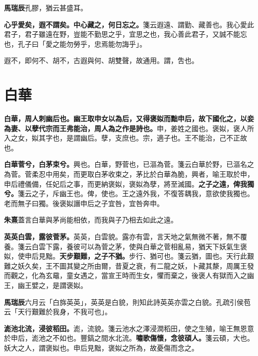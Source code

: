 \begin{quoting}\textbf{馬瑞辰}孔膠，猶云甚盛耳。\end{quoting}

\textbf{心乎愛矣，遐不謂矣。中心藏之，何日忘之。}{\footnotesize 箋云遐遠、謂勤、藏善也。我心愛此君子，君子雖遠在野，豈能不勤思之乎，宜思之也，我心善此君子，又誠不能忘也，孔子曰「愛之能勿勞乎，忠焉能勿誨乎」。}

\begin{quoting}遐不，即何不、胡不，古遐與何、胡雙聲，故通用。謂，吿也。\end{quoting}

\section{白華}


\textbf{白華，周人刺幽后也。幽王取申女以為后，又得褒姒而黜申后，故下國化之，以妾為妻、以孽代宗而王弗能治，周人為之作是詩也。}{\footnotesize 申，姜姓之國也。褒姒，褒人所入之女，姒其字也，是謂幽后。孽，支庶也。宗，適子也。王不能治，己不正故也。}

\textbf{白華菅兮，白茅束兮。}{\footnotesize 興也。白華，野菅也，已漚為菅。箋云白華於野，已漚名之為菅。菅柔忍中用矣，而更取白茅收束之，茅比於白華為脆，興者，喻王取於申，申后禮儀備，任妃后之事，而更納褒姒，褒姒為孽，將至滅國。}\textbf{之子之遠，俾我獨兮。}{\footnotesize 箋云之子，斥幽王也。俾，使也。王之遠外我，不復答耦我，意欲使我獨也。老而無子曰獨。後褒姒譖申后之子宜咎，宜咎奔申。}

\begin{quoting}\textbf{朱熹}蓋言白華與茅尚能相依，而我與子乃相去如此之遠。\end{quoting}

\textbf{英英白雲，露彼菅茅。}{\footnotesize 英英，白雲貌。露亦有雲，言天地之氣無微不著，無不覆養。箋云白雲下露，養彼可以為菅之茅，使與白華之菅相亂易，猶天下妖氣生褒姒，使申后見黜。}\textbf{天步艱難，之子不猶。}{\footnotesize 步行、猶可也。箋云猶，圖也。天行此艱難之妖久矣，王不圖其變之所由爾，昔夏之衰，有二龍之妖，卜藏其漦，周厲王發而觀之，化為玄黿，童女遇之，當宣王時而生女，懼而棄之，後褒人有獄而入之幽王，幽王嬖之，是謂褒姒。}

\begin{quoting}\textbf{馬瑞辰}六月云「白旆英英」，英英是白貌，則知此詩英英亦雲之白貌。孔疏引侯苞云「天行艱難於我身，不我可也」。\end{quoting}

\textbf{滮池北流，浸彼稻田。}{\footnotesize 滮，流貌。箋云池水之澤浸潤稻田，使之生殖，喻王無恩意於申后，滮池之不如也。豐鎬之間水北流。}\textbf{嘯歌傷懷，念彼碩人。}{\footnotesize 箋云碩，大也。妖大之人，謂褒姒也。申后見黜，褒姒之所為，故憂傷而念之。}


